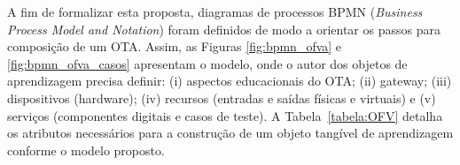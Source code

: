 
A fim de formalizar esta proposta, diagramas de processos BPMN (\textit{Business Process Model and Notation}) foram definidos de modo a orientar os passos para composição de um OTA. Assim, as Figuras \ref{fig:bpmn_ofva} e \ref{fig:bpmn_ofva_casos} apresentam o modelo, onde o autor dos objetos de aprendizagem precisa definir: (i) aspectos educacionais do OTA; (ii) gateway; (iii) dispositivos (hardware); (iv) recursos (entradas e saídas físicas e virtuais) e (v) serviços (componentes digitais e casos de teste). A Tabela~\ref{tabela:OFV} detalha os atributos necessários para a construção de um objeto tangível de aprendizagem conforme o modelo proposto.



